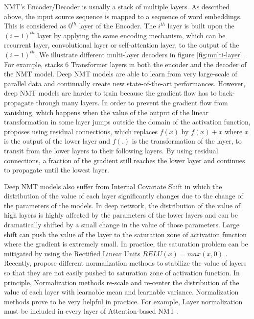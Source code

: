 NMT's Encoder/Decoder is usually a stack of multiple layers. As described above, the input source sequence is mapped to a sequence of word embeddings. This is considered as $0^{th}$ layer of the Encoder. The $i^{th}$ layer is built upon the $(i-1)^{th}$ layer by applying the same encoding mechanism, which can be recurrent layer, convolutional layer or self-attention layer, to the output of the $(i-1)^{th}$. We illustrate different multi-layer decoders in figure \ref{fig:multi-layer}. For example, \cite{Vaswani17attention} stacks 6 Transformer layers in both the encoder and the decoder of the NMT model. Deep NMT models are able to learn from very large-scale of parallel data \cite{Ott18scaling} and continually create new state-of-the-art performances. However, deep NMT models are harder to train because the gradient flow has to back-propagate through many layers. In order to prevent the gradient flow from vanishing, which happens when the value of the output of the linear transformation in some layer jumps outside the domain of the activation function, \citep{He16deep} proposes using residual connections, which replaces $f(x)$ by $f(x)+x$ where $x$ is the output of the lower layer and $f(.)$ is the transformation of the layer, to transit from the lower layers to their following layers. By using residual connections, a fraction of the gradient still reaches the lower layer and continues to propagate until the lowest layer.

Deep NMT models also suffer from Internal Covariate Shift in which the distribution of the value of each layer significantly changes due to the change of the parameters of the models. In deep network, the distribution of the value of high layers is highly affected by the parameters of the lower layers and can be dramatically shifted by a small change in the value of those parameters. Large shift can push the value of the layer to the saturation zone of activation function where the gradient is extremely small. In practice, the saturation problem can be mitigated by using the Rectified Linear Units $RELU(x) = max(x,0)$ \cite{Nair10rectified}. Recently, \citep{Ioffe15batch,Jimmy16layer} propose different normalization methods to stabilize the value of layers so that they are not easily pushed to saturation zone of activation function. In principle, Normalization methods re-scale and re-center the distribution of the value of each layer with learnable mean and learnable variance. Normalization methods prove to be very helpful in practice. For example, Layer normalization must be included in every layer of Attention-based NMT \cite{Vaswani17attention}.

